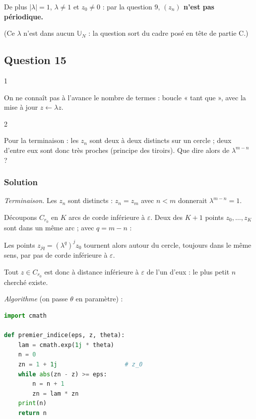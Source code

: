 \documentclass[11pt,a4paper]{article}
\newcommand{\equationajustee}[1]{%
  \sbox{\boiteequation}{$\displaystyle #1$}%
  \ifdim\wd\boiteequation>\linewidth
    \[\resizebox{\linewidth}{!}{\usebox{\boiteequation}}\]%
  \else
    \[#1\]%
  \fi}
\begin{document}
De plus \(|\lambda|=1\), \(\lambda\neq1\) et \(z_0\neq0\) : par la question 9, \textbf{\((z_n)\) n'est pas périodique.}

(Ce \(\lambda\) n'est dans aucun \({\mathbb{U}}_N\) : la question sort du cadre posé en tête de partie C.)

\hypertarget{question-15}{%
\subsection{Question 15}\label{question-15}}

\begin{indication}{1}

On ne connaît pas à l'avance le nombre de termes : boucle « tant que », avec la mise à jour \(z\leftarrow\lambda z\).

\end{indication}

\begin{indication}{2}

Pour la terminaison : les \(z_n\) sont deux à deux distincts sur un cercle ; deux d'entre eux sont donc très proches (principe des tiroirs). Que dire alors de \(\lambda^{m-n}\) ?

\end{indication}

\hypertarget{solution-58}{%
\subsubsection{Solution}\label{solution-58}}

\emph{Terminaison.} Les \(z_n\) sont distincts : \(z_n=z_m\) avec \(n<m\) donnerait \(\lambda^{m-n}=1\).

Découpons \(C_{r_0}\) en \(K\) arcs de corde inférieure à \(\varepsilon\). Deux des \(K+1\) points \(z_0,\dots,z_K\) sont dans un même arc ; avec \(q=m-n\) :

\equationajustee{0<|z_m-z_n|=r_0|\lambda^q-1|<\varepsilon.}

Les points \(z_{jq}=(\lambda^q)^jz_0\) tournent alors autour du cercle, toujours dans le même sens, par pas de corde inférieure à \(\varepsilon\).

Tout \(z\in C_{r_0}\) est donc à distance inférieure à \(\varepsilon\) de l'un d'eux : le plus petit \(n\) cherché existe.

\emph{Algorithme} (on passe \(\theta\) en paramètre) :

\begin{lstlisting}[language=Python]
import cmath

def premier_indice(eps, z, theta):
    lam = cmath.exp(1j * theta)
    n = 0
    zn = 1 + 1j                   # z_0
    while abs(zn - z) >= eps:
        n = n + 1
        zn = lam * zn
    print(n)
    return n
\end{lstlisting}
\end{document}
